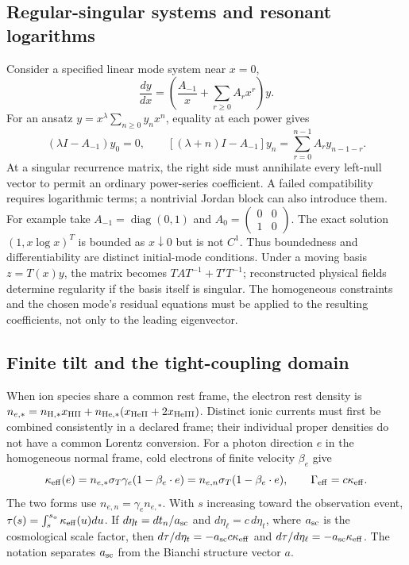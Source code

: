 \subsection{Regular-singular systems and resonant logarithms}
\label{geo:fuchs_initial}
Consider a specified linear mode system near $x=0$,
\begin{equation}
 \frac{dy}{dx}=\left(\frac{A_{-1}}x+\sum_{r\ge0}A_rx^r\right)y.
 \label{geo:fuchs_system}
\end{equation}
For an ansatz $y=x^\lambda\sum_{n\ge0}y_nx^n$, equality at each power gives
\begin{equation}
 (\lambda I-A_{-1})y_0=0,\qquad
 [ (\lambda+n)I-A_{-1}]y_n
       =\sum_{r=0}^{n-1}A_r y_{n-1-r}.
 \label{geo:fuchs_recurrence}
\end{equation}
At a singular recurrence matrix, the right side must annihilate every left-null vector to permit an ordinary power-series coefficient. A failed compatibility requires logarithmic terms; a nontrivial Jordan block can also introduce them. For example take $A_{-1}=\operatorname{diag}(0,1)$ and
$A_0=\left(\begin{smallmatrix}0&0\\1&0\end{smallmatrix}\right)$. The exact solution $(1,x\log x)^T$ is bounded as $x\downarrow0$ but is not $C^1$. Thus boundedness and differentiability are distinct initial-mode conditions. Under a moving basis $z=T(x)y$, the matrix becomes
$TAT^{-1}+T'T^{-1}$; reconstructed physical fields determine regularity if the basis itself is singular. The homogeneous constraints and the chosen mode's residual equations must be applied to the resulting coefficients, not only to the leading eigenvector.

\subsection{Finite tilt and the tight-coupling domain}
\label{geo:tight_coupling_initial}
When ion species share a common rest frame, the electron rest density is
$n_{e,*}=n_{{\rm H},*}x_{\rm HII}+n_{{\rm He},*}(x_{\rm HeII}+2x_{\rm HeIII})$.
Distinct ionic currents must first be combined consistently in a declared frame; their individual proper densities do not have a common Lorentz conversion. For a photon direction $e$ in the homogeneous normal frame, cold electrons of finite velocity $\beta_e$ give
\begin{equation}
 \kappa_{\rm eff}(e)=n_{e,*}\sigma_T\gamma_e(1-\beta_e\cdot e)
     =n_{e,n}\sigma_T(1-\beta_e\cdot e),\qquad
 \Gamma_{\rm eff}=c\kappa_{\rm eff}.
 \label{geo:tilted_opacity}
\end{equation}
The two forms use $n_{e,n}=\gamma_en_{e,*}$. With $s$ increasing toward the observation event,
$\tau(s)=\int_s^{s_o}\kappa_{\rm eff}(u)du$. If $d\eta_t=dt_n/a_{\rm sc}$ and $d\eta_\ell=c\,d\eta_t$, where $a_{\rm sc}$ is the cosmological scale factor, then
$d\tau/d\eta_t=-a_{\rm sc}c\kappa_{\rm eff}$ and
$d\tau/d\eta_\ell=-a_{\rm sc}\kappa_{\rm eff}$. The notation separates $a_{\rm sc}$ from the Bianchi structure vector $a$.

